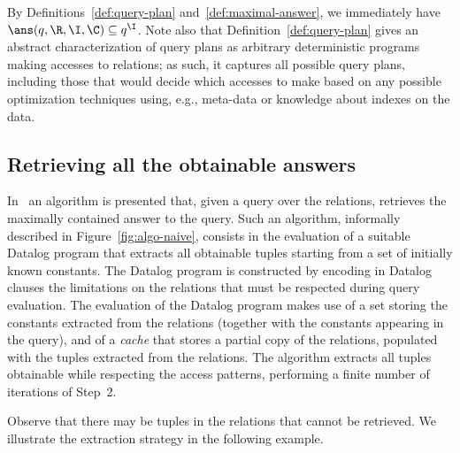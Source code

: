 By Definitions~\ref{def:query-plan} and~\ref{def:maximal-answer}, we immediately have $\ans(q,\R,\I,\C)\subseteq q^\I$. Note also that Definition~\ref{def:query-plan} gives an abstract characterization of query plans as arbitrary deterministic programs making accesses to relations; as such, it captures all possible query plans, including those that would decide which accesses to make based on any possible optimization techniques using, e.g., meta-data or knowledge about indexes on the data.

\subsection{Retrieving all the obtainable answers}
\label{subsec:nonoptimized-algo}

In~\cite{LiCh00} an algorithm is presented that, given a query over the relations, retrieves the maximally contained answer to the query. Such an algorithm, informally described in Figure~\ref{fig:algo-naive}, consists in the evaluation of a suitable Datalog program that extracts all obtainable tuples starting from a set of initially known constants. The Datalog program is constructed by encoding in Datalog clauses the limitations on the relations that must be respected during query evaluation. The evaluation of the Datalog program makes use of a set storing the constants extracted from the relations (together with the constants appearing in the query), and of a \emph{cache} that stores a partial copy of the relations, populated with the tuples extracted from the relations. The algorithm extracts all tuples obtainable while respecting the access patterns, performing a finite number of iterations of Step~2.

Observe that there may be tuples in the relations that cannot be retrieved.
We illustrate the extraction strategy in the following example.

